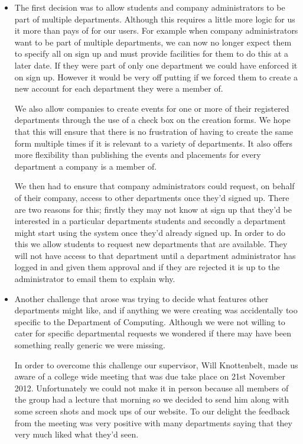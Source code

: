     \begin{itemize}
      \item  The first decision was to allow students and company administrators to be part of multiple departments. Although this requires a little more logic for us it more than pays of for our users. For example when company administrators want to be part of multiple departments, we can now no longer expect them to specify all on sign up and must provide facilities for them to do this at a later date. If they were part of only one department we could have enforced it on sign up. However it would be very off putting if we forced them to create a new account for each department they were a member of.

      We also allow companies to create events for one or more of their registered departments through the use of a check box on the creation forms. We hope that this will ensure that there is no frustration of having to create the same form multiple times if it is relevant to a variety of departments. It also offers more flexibility than publishing the events and placements for every department a company is a member of.

      We then had to ensure that company administrators could request, on behalf of their company, access to other departments once they'd signed up. There are two reasons for this; firstly they may not know at sign up that they'd be interested in a particular departments students and secondly a department might start using the system once they'd already signed up. In order to do this we allow students to request new departments that are available. They will not have access to that department until a department administrator has logged in and given them approval and if they are rejected it is up to the administrator to email them to explain why. 
      
      \item Another challenge that arose was trying to decide what features other departments might like, and if anything we were creating was accidentally too specific to the Department of Computing. Although we were not willing to cater for specific departmental requests we wondered if there may have been something really generic we were missing.

      In order to overcome this challenge our supervisor, Will Knottenbelt, made us aware of a college wide meeting that was due take place on 21st November 2012. Unfortunately we could not make it in person because all members of the group had a lecture that morning so we decided to send him along with some screen shots and mock ups of our website. To our delight the feedback from the meeting was very positive with many departments saying that they very much liked what they'd seen. 
      

\end{itemize}
